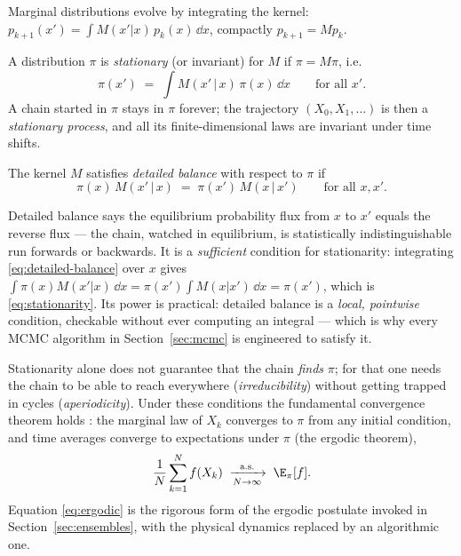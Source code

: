 Marginal distributions evolve by integrating the kernel:
$p_{k+1}(x') = \int M(x'|x)\, p_k(x)\,\dd x$, compactly $p_{k+1} = M p_k$.

\begin{definition}[Stationarity]
A distribution $\pi$ is \emph{stationary} (or invariant) for $M$ if
$\pi = M\pi$, i.e.
\begin{equation}
  \pi(x') \;=\; \int M(x' \,|\, x)\, \pi(x)\, \dd x
  \qquad \text{for all } x' .
  \label{eq:stationarity}
\end{equation}
A chain started in $\pi$ stays in $\pi$ forever; the trajectory
$(X_0, X_1, \dots)$ is then a \emph{stationary process}, and all its
finite-dimensional laws are invariant under time shifts.
\end{definition}

\begin{definition}
The kernel $M$ satisfies \emph{detailed balance} with respect to $\pi$ if
\begin{equation}
  \pi(x)\, M(x' \,|\, x) \;=\; \pi(x')\, M(x \,|\, x')
  \qquad \text{for all } x, x' .
  \label{eq:detailed-balance}
\end{equation}
\end{definition}

Detailed balance says the equilibrium probability flux from $x$ to $x'$
equals the reverse flux --- the chain, watched in equilibrium, is
statistically indistinguishable run forwards or backwards. It is a
\emph{sufficient} condition for stationarity: integrating
\eqref{eq:detailed-balance} over $x$ gives
$\int \pi(x) M(x'|x)\,\dd x = \pi(x') \int M(x|x')\,\dd x = \pi(x')$,
which is \eqref{eq:stationarity}. Its power is practical: detailed balance is
a \emph{local, pointwise} condition, checkable without ever computing an
integral --- which is why every MCMC algorithm in Section~\ref{sec:mcmc} is
engineered to satisfy it.

Stationarity alone does not guarantee that the chain \emph{finds} $\pi$; for
that one needs the chain to be able to reach everywhere
(\emph{irreducibility}) without getting trapped in cycles
(\emph{aperiodicity}). Under these conditions the fundamental convergence
theorem holds \citep{robert2004monte}: the marginal law of $X_k$ converges to
$\pi$ from any initial condition, and time averages converge to expectations
under $\pi$ (the ergodic theorem),
\begin{equation}
  \frac{1}{N} \sum_{k=1}^{N} f(X_k)
  \;\xrightarrow[N \to \infty]{\text{a.s.}}\;
  \E_\pi[f] .
  \label{eq:ergodic}
\end{equation}
Equation \eqref{eq:ergodic} is the rigorous form of the ergodic postulate
invoked in Section~\ref{sec:ensembles}, with the physical dynamics replaced
by an algorithmic one.


